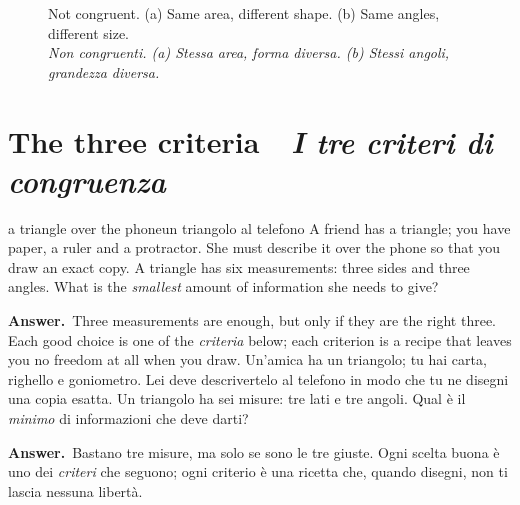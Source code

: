 \documentclass[10pt,a4paper,oneside]{book}
\newif\ifIT
\newcommand{\bisection}[2]{%
  \Needspace{7\baselineskip}%
  \section[#1 \textperiodcentered\ #2]{#1 {\color{itgreen}\itshape\,\textperiodcentered\ #2}}}
\newcommand{\bicap}[2]{\caption{#1\\{\color{itgreen}\itshape #2}}}
\newcommand{\answer}{\par\vspace{2pt}{\color{deeporange}\rule[0.5ex]{\linewidth}{0.4pt}}\par
  {\sffamily\bfseries\small\color{deeporange}\ifIT Risposta\else Answer\fi.}\ }
\begin{document}
\begin{figure}[htbp]
\centering
\bicap{Not congruent. (a) Same area, different shape. (b) Same angles, different size.}%
      {Non congruenti. (a) Stessa area, forma diversa. (b) Stessi angoli, grandezza diversa.}
\label{fig:notcong}
\end{figure}

\bisection{The three criteria}{I tre criteri di congruenza}\label{sec:criteria}
\begin{think}{a triangle over the phone}{un triangolo al telefono}
A friend has a triangle; you have paper, a ruler and a protractor. She must describe it over the phone so that you draw an exact copy. A triangle has six measurements: three sides and three angles. What is the \emph{smallest} amount of information she needs to give?
\answer Three measurements are enough, but only if they are the right three. Each good choice is one of the \emph{criteria} below; each criterion is a recipe that leaves you no freedom at all when you draw.
\tcblower
Un'amica ha un triangolo; tu hai carta, righello e goniometro. Lei deve descrivertelo al telefono in modo che tu ne disegni una copia esatta. Un triangolo ha sei misure: tre lati e tre angoli. Qual è il \emph{minimo} di informazioni che deve darti?
\answer Bastano tre misure, ma solo se sono le tre giuste. Ogni scelta buona è uno dei \emph{criteri} che seguono; ogni criterio è una ricetta che, quando disegni, non ti lascia nessuna libertà.
\end{think}
\end{document}
